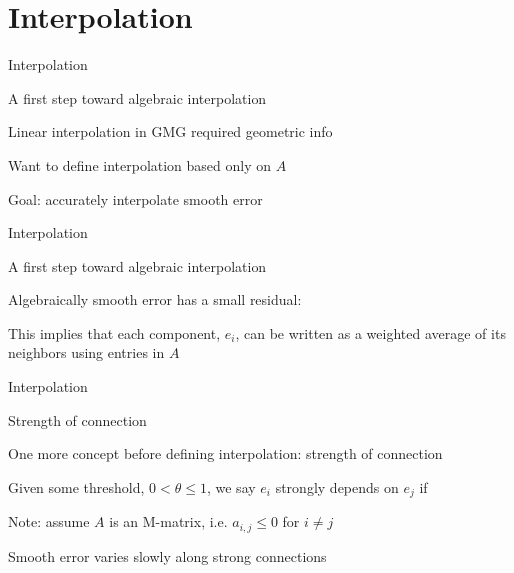 \documentclass[18pt,xcolor=table]{beamer}
\begin{document}


\section{Interpolation}

\begin{frame}{Interpolation}
\begin{block}{A first step toward algebraic interpolation}
\bit
\item Linear interpolation in GMG required geometric info
\item Want to define interpolation based only on $A$
\item Goal: accurately interpolate smooth error
\eit
\end{block}
\end{frame}

\begin{frame}{Interpolation}
\begin{block}{A first step toward algebraic interpolation}
\bit
\item Algebraically smooth error has a small residual:
\item This implies that each component, $e_i$, can be written as a weighted average of its neighbors using entries in $A$
\eit
\end{block}
\end{frame}

\begin{frame}{Interpolation}
\begin{block}{Strength of connection}
\bit
\item One more concept before defining interpolation: strength of connection
\item Given some threshold, $0 < \theta \leq 1$, we say $e_i$ strongly depends on $e_j$ if
\item Note: assume $A$ is an M-matrix, i.e. $a_{i,j}\leq 0$ for $i\neq j$
\item Smooth error varies slowly along strong connections 
\eit
\end{block}
\end{frame}
\end{document}

